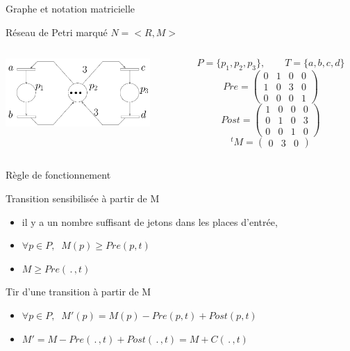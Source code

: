 \documentclass[compress]{beamer}
\begin{document}
\begin{frame}{Graphe et notation matricielle}
\begin{block}{Réseau de Petri marqué $N=<\!R,M\!>$}
\begin{columns}
	\begin{column}{.5\textwidth}
		\includegraphics[width=5.5cm]{lececr}
	\end{column}
	\begin{column}{.6\textwidth}
		$$P=\{p_1,p_2,p_3\}, \qquad T=\{a,b,c,d\}$$
		$$Pre = \begin{pmatrix}
			0 & 1 & 0 & 0 \\
			1 & 0 & 3 & 0 \\
			0 & 0 & 0 & 1 
			\end{pmatrix}$$
		$$Post = \begin{pmatrix}
			1 & 0 & 0 & 0 \\
			0 & 1 & 0 & 3 \\
			0 & 0 & 1 & 0 
			\end{pmatrix}$$
		$${}^tM = \begin{pmatrix}0 & 3 & 0\end{pmatrix}$$
	\end{column}	
\end{columns}
\end{block}
\end{frame}

\begin{frame}{Règle de fonctionnement}
\begin{block}{Transition sensibilisée à partir de M}
	\begin{itemize}
	\item il y a un nombre suffisant de jetons dans les places d'entrée,
	\item $\forall p \in P, \;\;  M(p) \geq Pre(p, t)$
	\item $M \geq Pre(\, . \, ,t)$
	\end{itemize}
\end{block}
\begin{block}{Tir d'une transition à partir de M}
	\begin{itemize}
	\item $\forall p \in P, \;\; M'(p)=M(p)-Pre(p,t)+Post(p,t)$
	\item $M'=M-Pre(\, . \, ,t)+Post(\, . \, ,t)=M + C(\, . \, ,t)$
	\end{itemize}
\end{block}
\end{frame}
\end{document}
